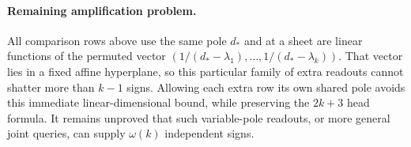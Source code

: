 \documentclass[11pt]{article}
\begin{document}
\paragraph{Remaining amplification problem.}
All comparison rows above use the same pole $d_*$ and at a sheet are
linear functions of the permuted vector
$(1/(d_*-\lambda_1),\ldots,1/(d_*-\lambda_k))$.
That vector lies in a fixed affine hyperplane, so this particular
family of extra readouts cannot shatter more than $k-1$ signs.
Allowing each extra row its own shared pole avoids this immediate
linear-dimensional bound, while preserving the $2k+3$ head formula.
It remains unproved that such variable-pole readouts, or more general
joint queries, can supply $\omega(k)$ independent signs.
\end{document}
